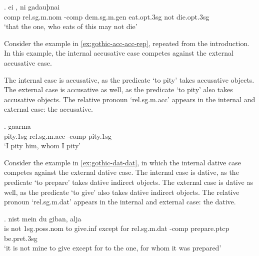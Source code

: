\exg. ei    , ni gadauþnai\\
\ac{comp} \ac{rel}.\ac{sg}.\ac{m}.\ac{nom} -\ac{comp} \ac{dem}.\ac{sg}.\ac{m}.\ac{gen} eat.\ac{opt}.3\ac{sg}\scsub{[nom]} not die.\ac{opt}.3\ac{sg}\scsub{[nom]}\\
`that the one, who eats of this may not die' \label{ex:gothic-nom-nom}

Consider the example in \ref{ex:gothic-acc-acc-rep}, repeated from the introduction. In this example, the internal accusative case competes against the external accusative case.

The internal case is accusative, as the predicate  `to pity' takes accusative objects.
The external case is accusative as well, as the predicate  `to pity' also takes accusative objects.
The relative pronoun  `\ac{rel}.\ac{sg}.\ac{m}.\ac{acc}' appears in the internal and external case: the accusative.

\exg. gaarma   \\
 pity.1\ac{sg}\scsub{[acc]} \ac{rel}.\ac{sg}.\ac{m}.\ac{acc} -\ac{comp} pity.1\ac{sg}\scsub{[acc]}\\
 `I pity him, whom I pity' \label{ex:gothic-acc-acc-rep}

Consider the example in \ref{ex:gothic-dat-dat}, in which the internal dative case competes against the external dative case.
The internal case is dative, as the predicate  `to prepare' takes dative indirect objects.
The external case is dative as well, as the predicate  `to give' also takes dative indirect objects.
The relative pronoun  `\ac{rel}.\ac{sg}.\ac{m}.\ac{dat}' appears in the internal and external case: the dative.

\exg. nist mein du giban, alja    \\
{is not} 1\ac{sg}.\ac{poss}.\ac{nom} to give.\ac{inf}\scsub{[dat]} {except for} \ac{rel}.\ac{sg}.\ac{m}.\ac{dat} -\ac{comp} prepare.\ac{ptcp} be.\ac{pret}.3\ac{sg}\scsub{[dat]}\\
`it is not mine to give except for to the one, for whom it was prepared'\label{ex:gothic-dat-dat}

